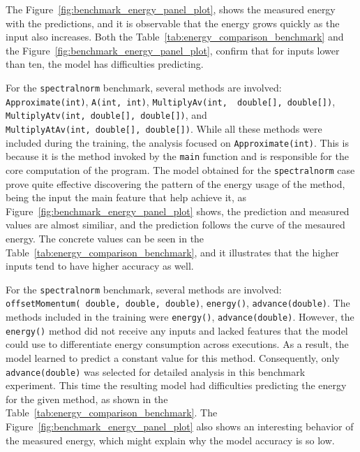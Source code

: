 

The Figure~\ref{fig:benchmark_energy_panel_plot}, shows the measured energy with the predictions, and it is observable that the energy grows quickly as the input also increases. Both the Table~\ref{tab:energy_comparison_benchmark} and the Figure~\ref{fig:benchmark_energy_panel_plot}, confirm that for inputs lower than ten, the model has difficulties predicting.


{\color{blue}For the \texttt{spectralnorm} benchmark, several methods are involved: \texttt{Approximate(int)}, \texttt{A(int, int)}, \texttt{MultiplyAv(int, \allowbreak\ double[],\allowbreak\ double[])}, \texttt{MultiplyAtv(int,\allowbreak\ double[],\allowbreak\ double[])}, and \texttt{MultiplyAtAv(int,\allowbreak\ double[],\allowbreak\ double[])}. While all these methods were included during the training, the analysis focused on \texttt{Approximate(int)}. This is because it is the method invoked by the \texttt{main} function and is responsible for the core computation of the program.}
The model obtained for the \texttt{spectralnorm} case prove quite effective discovering the pattern of the energy usage of the method, being the input the main feature that help achieve it, as Figure~\ref{fig:benchmark_energy_panel_plot} shows, the prediction and measured values are almost similiar, and the prediction follows the curve of the mesaured energy. The concrete values can be seen in the Table~\ref{tab:energy_comparison_benchmark}, and it illustrates that the higher inputs tend to have higher accuracy as well.


{\color{blue}For the \texttt{spectralnorm} benchmark, several methods are involved: \texttt{offsetMomentum(\allowbreak\ double,\allowbreak\ double,\allowbreak\ double)},
\texttt{energy()}, \texttt{advance(double)}. The methods included in the training were \texttt{energy()}, \texttt{advance(double)}. However, the \texttt{energy()} method did not receive any inputs and lacked features that the model could use to differentiate energy consumption across executions. As a result, the model learned to predict a constant value for this method. Consequently, only \texttt{advance(double)} was selected for detailed analysis in this benchmark experiment.}
This time the resulting model had difficulties predicting the energy for the given method, as shown in the Table~\ref{tab:energy_comparison_benchmark}. The Figure~\ref{fig:benchmark_energy_panel_plot} also shows an interesting behavior of the measured energy, which might explain why the model accuracy is so low.


